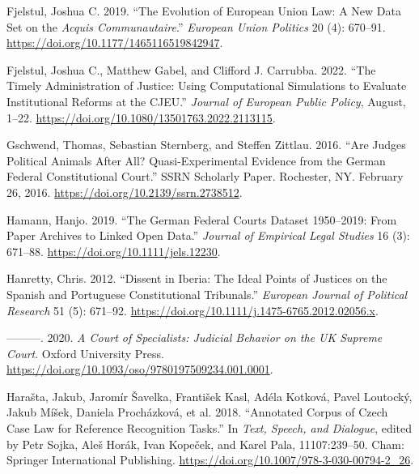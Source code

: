 \documentclass[
  11pt,
]{article}
\newlength{\cslhangindent}
\newenvironment{CSLReferences}[2] %
 {%
  \setlength{\parindent}{0pt}
  \ifodd #1 \everypar{\setlength{\hangindent}{\cslhangindent}}\ignorespaces\fi
  \ifnum #2 > 0
  \setlength{\parskip}{#2\baselineskip}
  \fi
 }%
 {}
\begin{document}
\begin{CSLReferences}{1}{0}
\leavevmode{}%
Fjelstul, Joshua C. 2019. {``The Evolution of {European Union} Law: {A}
New Data Set on the {\emph{Acquis Communautaire}}.''} \emph{European
Union Politics} 20 (4): 670--91.
\url{https://doi.org/10.1177/1465116519842947}.

\leavevmode{}%
Fjelstul, Joshua C., Matthew Gabel, and Clifford J. Carrubba. 2022.
{``The Timely Administration of Justice: Using Computational Simulations
to Evaluate Institutional Reforms at the {CJEU}.''} \emph{Journal of
European Public Policy}, August, 1--22.
\url{https://doi.org/10.1080/13501763.2022.2113115}.

\leavevmode{}%
Gschwend, Thomas, Sebastian Sternberg, and Steffen Zittlau. 2016. {``Are
{Judges Political Animals} After {All}? {Quasi-Experimental Evidence}
from the {German Federal Constitutional Court}.''} SSRN Scholarly Paper.
{Rochester, NY}. February 26, 2016.
\url{https://doi.org/10.2139/ssrn.2738512}.

\leavevmode{}%
Hamann, Hanjo. 2019. {``The {German Federal Courts Dataset} 1950--2019:
{From Paper Archives} to {Linked Open Data}.''} \emph{Journal of
Empirical Legal Studies} 16 (3): 671--88.
\url{https://doi.org/10.1111/jels.12230}.

\leavevmode{}%
Hanretty, Chris. 2012. {``Dissent in {Iberia}: {The} Ideal Points of
Justices on the {Spanish} and {Portuguese Constitutional Tribunals}.''}
\emph{European Journal of Political Research} 51 (5): 671--92.
\url{https://doi.org/10.1111/j.1475-6765.2012.02056.x}.

\leavevmode{}%
---------. 2020. \emph{A {Court} of {Specialists}: {Judicial Behavior}
on the {UK Supreme Court}}. {Oxford University Press}.
\url{https://doi.org/10.1093/oso/9780197509234.001.0001}.

\leavevmode{}%
Harašta, Jakub, Jaromír Šavelka, František Kasl, Adéla Kotková, Pavel
Loutocký, Jakub Míšek, Daniela Procházková, et al. 2018. {``Annotated
{Corpus} of {Czech Case Law} for {Reference Recognition Tasks}.''} In
\emph{Text, {Speech}, and {Dialogue}}, edited by Petr Sojka, Aleš Horák,
Ivan Kopeček, and Karel Pala, 11107:239--50. {Cham}: {Springer
International Publishing}.
\url{https://doi.org/10.1007/978-3-030-00794-2_26}.


\end{CSLReferences}
\end{document}

